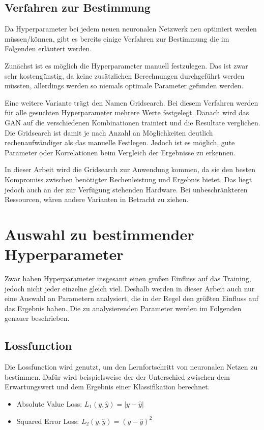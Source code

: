 \subsection{Verfahren zur Bestimmung}
Da Hyperparameter bei jedem neuen neuronalen Netzwerk neu optimiert werden müssen/können, gibt es bereits einige Verfahren zur Bestimmung die im Folgenden erläutert werden.
\newline

Zunächst ist es möglich die Hyperparameter manuell festzulegen.
Das ist zwar sehr kostengünstig, da keine zusätzlichen Berechnungen durchgeführt werden müssten, allerdings werden so niemals optimale Parameter gefunden werden.
\newline

Eine weitere Variante trägt den Namen Gridsearch.
Bei diesem Verfahren werden für alle gesuchten Hyperparameter mehrere Werte festgelegt.
Danach wird das GAN auf die verschiedenen Kombinationen trainiert und die Resultate verglichen.
Die Gridsearch ist damit je nach Anzahl an Möglichkeiten deutlich rechenaufwändiger als das manuelle Festlegen.
Jedoch ist es möglich, gute Parameter oder Korrelationen beim Vergleich der Ergebnisse zu erkennen.
\newline


In dieser Arbeit wird die Gridsearch zur Anwendung kommen, da sie den besten Kompromiss zwischen benötigter Rechenleistung und Ergebnis bietet.
Das liegt jedoch auch an der zur Verfügung stehenden Hardware.
Bei unbeschränkteren Ressourcen, wären andere Varianten in Betracht zu ziehen.

\section{Auswahl zu bestimmender Hyperparameter}
Zwar haben Hyperparameter insgesamt einen großen Einfluss auf das Training, jedoch nicht jeder einzelne gleich viel.
Deshalb werden in dieser Arbeit auch nur eine Auswahl an Parametern analysiert, die in der Regel  den größten Einfluss auf das Ergebnis haben.
Die zu analysierenden Parameter werden im Folgenden genauer beschrieben.

\subsection{Lossfunction}
Die Lossfunction wird genutzt, um den Lernfortschritt von neuronalen Netzen zu bestimmen.
Dafür wird beispielsweise der der Unterschied zwischen dem Erwartungswert und dem Ergebnis einer Klassifikation berechnet.
\begin{itemize}
	\item Absolute Value Loss: $L_1(y, \hat{y}) = |y - \hat{y}|$
	\item Squared Error Loss: $L_2(y, \hat{y}) = (y - \hat{y})^2$
\end{itemize}

